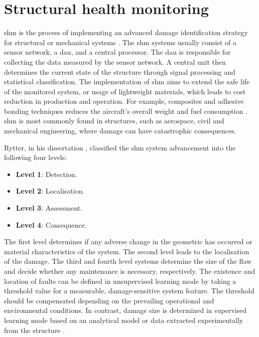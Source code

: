 \section{Structural health monitoring}
\label{sec:scm}

\Ac{shm} is the process of implementing an advanced damage identification strategy for structural or mechanical systems \cite{farrar2007introduction}.
The \ac{shm} systems usually consist of a sensor network, a \ac{dau}, and a central processor.
The \ac{dau} is responsible for collecting the data measured by the sensor network.
A central unit then determines the current state of the structure through signal processing and statistical classification.
The implementation of \ac{shm} aims to extend the safe life of the monitored system, or usage of lightweight materials, which leads to cost reduction in production and operation.
For example, composites and adhesive bonding techniques reduces the aircraft's overall weight and fuel consumption \cite{scelsi2011potential}.
\ac{shm} is most commonly found in structures, such as aerospace, civil and mechanical engineering, where damage can have catastrophic consequences.

Rytter, in his dissertation \cite{rytter1993vibrational}, classified the \ac{shm} system advancement into the following four levels:
\begin{itemize}
	\item[] \textbf{Level 1}: Detection.
	\item[] \textbf{Level 2}: Localisation.
	\item[] \textbf{Level 3}: Assessment.
	\item[] \textbf{Level 4}: Consequence.
\end{itemize}
The first level determines if any adverse change in the geometric has occurred or material characteristics of the system. 
The second level leads to the localisation of the damage.
The third and fourth level systems determine the size of the flaw and decide whether any maintenance is necessary, respectively.
The existence and location of faults can be defined in unsupervised learning mode by taking a threshold value for a measurable, damage-sensitive system feature. The threshold should be compensated depending on the prevailing operational and environmental conditions.
In contrast, damage size is determined in supervised learning mode based on an analytical model or data extracted experimentally from the structure \cite{worden2007fundamental}.